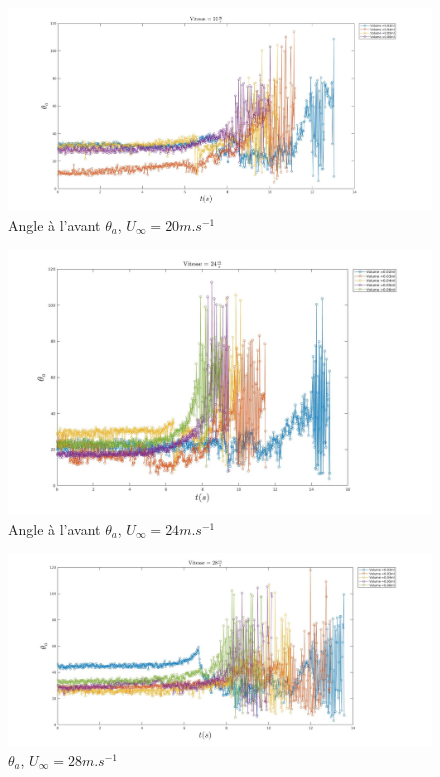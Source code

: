 \documentclass[french]{article}
\begin{document}
\begin{figure}[h]
	\centering
	\includegraphics[width = \linewidth]{./image/v=20oa_2.jpg}
	\caption{Angle à l'avant $\theta_{a}$, $U_{\infty}=20m.s^{-1}$}
\end{figure}
\begin{figure}[h]
	\centering
	\includegraphics[width = \linewidth]{./image/v=24oa_2.jpg}
	\caption{Angle à l'avant $\theta_{a}$, $U_{\infty}=24m.s^{-1}$}
\end{figure}
\begin{figure}[h]
	\centering
	\includegraphics[width = \linewidth]{./image/v=28oa_2.jpg}
	\caption{$\theta_{a}$, $U_{\infty}=28m.s^{-1}$}
\end{figure}
\end{document}
